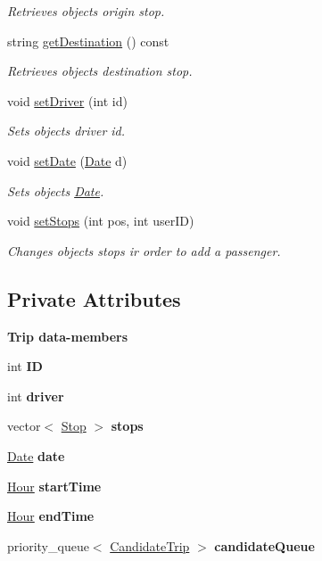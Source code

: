 \begin{Indent}
\begin{DoxyCompactItemize}
\begin{DoxyCompactList}\small\item\em Retrieves object\textquotesingle{}s origin stop. \end{DoxyCompactList}\item 
string \hyperlink{group___trip_ga576ad0d4c7a723aa4b2d12ebdd4eec99}{get\+Destination} () const
\begin{DoxyCompactList}\small\item\em Retrieves object\textquotesingle{}s destination stop. \end{DoxyCompactList}\item 
void \hyperlink{group___trip_ga2c5c0c0315b210154ba190a5470ec110}{set\+Driver} (int id)
\begin{DoxyCompactList}\small\item\em Sets object\textquotesingle{}s driver id. \end{DoxyCompactList}\item 
void \hyperlink{group___trip_ga26abc8edc0cb1f5c2eb1b6e292152701}{set\+Date} (\hyperlink{class_date}{Date} d)
\begin{DoxyCompactList}\small\item\em Sets object\textquotesingle{}s \hyperlink{class_date}{Date}. \end{DoxyCompactList}\item 
void \hyperlink{group___trip_gaa294f1f8844c2b47676e0e985d81b2a0}{set\+Stops} (int pos, int user\+ID)
\begin{DoxyCompactList}\small\item\em Changes object\textquotesingle{}s stops ir order to add a passenger. \end{DoxyCompactList}\end{DoxyCompactItemize}
\end{Indent}
\subsection*{Private Attributes}
\begin{Indent}\textbf{ Trip data-\/members}\par
\begin{DoxyCompactItemize}
\item 
int {\bfseries ID}
\item 
int {\bfseries driver}
\item 
vector$<$ \hyperlink{class_stop}{Stop} $>$ {\bfseries stops}
\item 
\hyperlink{class_date}{Date} {\bfseries date}
\item 
\hyperlink{class_hour}{Hour} {\bfseries start\+Time}
\item 
\hyperlink{class_hour}{Hour} {\bfseries end\+Time}
\item 
priority\+\_\+queue$<$ \hyperlink{class_candidate_trip}{Candidate\+Trip} $>$ {\bfseries candidate\+Queue}
\end{DoxyCompactItemize}
\end{Indent}
